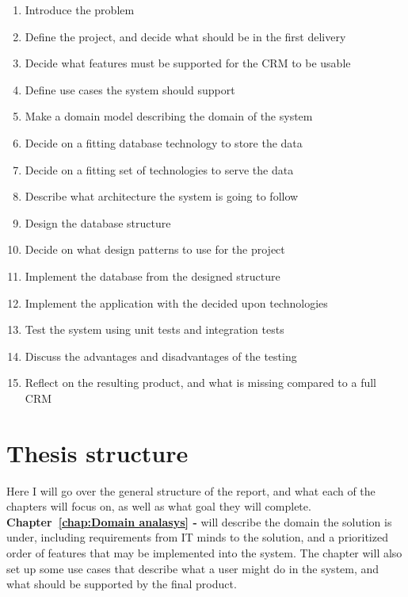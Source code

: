 \begin{enumerate}
  \item Introduce the problem
  \item Define the project, and decide what should be in the first delivery
  \item Decide what features must be supported for the CRM to be usable
  \item Define use cases the system should support
  \item Make a domain model describing the domain of the system
  \item Decide on a fitting database technology to store the data
  \item Decide on a fitting set of technologies to serve the data
  \item Describe what architecture the system is going to follow
  \item Design the database structure
  \item Decide on what design patterns to use for the project
  \item Implement the database from the designed structure
  \item Implement the application with the decided upon technologies
  \item Test the system using unit tests and integration tests
  \item Discuss the advantages and disadvantages of the testing
  \item Reflect on the resulting product, and what is missing compared to a full CRM
\end{enumerate}

\section{Thesis structure}
\label{sec:Thesis structure}
Here I will go over the general structure of the report, and what each of the chapters will focus on, as well as what goal they will complete.\\

\textbf{Chapter~\ref{chap:Domain analasys} - } will describe the domain the solution is under, including requirements from IT minds to the solution, and a prioritized order of features that may be implemented into the system. The chapter will also set up some use cases that describe what a user might do in the system, and what should be supported by the final product.

